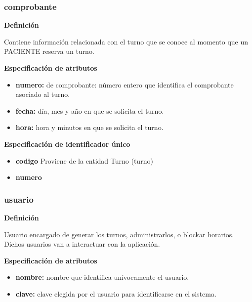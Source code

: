 \documentclass[a4paper,11pt]{article}
\begin{document}
\subsubsection{\textbf{comprobante}}

\textbf{Definición}

Contiene información relacionada con el turno que se conoce al momento que un 
PACIENTE reserva un turno.

\textbf{Especificación de atributos}

\begin{itemize}

     \item \textbf{numero:} de comprobante: número entero que identifica el comprobante asociado 
     al turno.

     \item \textbf{fecha:} día, mes y año en que se solicita el turno.

     \item \textbf{hora:} hora y minutos en que se solicita el turno.

\end{itemize}

\textbf{Especificación de identificador único}

\begin{itemize}

     \item \textbf{codigo} Proviene de la entidad Turno (turno)

     \item \textbf{numero}

\end{itemize}

\subsubsection{\textbf{usuario}}

\textbf{Definición}

Usuario encargado de generar los turnos, administrarlos, o blockar horarios.
Dichos usuarios van a interactuar con la aplicación.

\textbf{Especificación de atributos}

\begin{itemize}

     \item \textbf{nombre:} nombre que identifica unívocamente el usuario. 
	 
	 \item \textbf{clave:} clave elegida por el usuario para identificarse en el sistema. 
\end{itemize}
\end{document}
